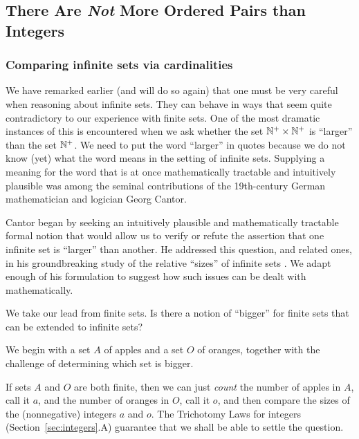 \subsection{There Are {\em Not} More Ordered Pairs than Integers}
\label{sec:cardinality-NxN}

\subsubsection{Comparing infinite sets via cardinalities}
\label{sec:compare-sets-via-card}

We have remarked earlier (and will do so again) that one must be very
careful when reasoning about infinite sets.  They can behave in ways
that seem quite contradictory to our experience with finite sets.  One
of the most dramatic instances of this is encountered when we ask
whether the set $\mathbb{N}^+ \times \mathbb{N}^+$ is ``larger'' than the set $\mathbb{N}^+$.
We need to put the word ``larger'' in quotes because we do not know
(yet) what the word means in the setting of infinite sets.  Supplying
a meaning for the word that is at once mathematically tractable and
intuitively plausible was among the seminal contributions of the
19th-century German mathematician and logician Georg
Cantor. 


Cantor began by seeking an intuitively plausible and mathematically
tractable formal notion that would allow us to verify or refute the
assertion that one infinite set is ``larger'' than another.  He
addressed this question, and related ones, in his groundbreaking study
of the relative ``sizes'' of infinite sets \cite{Cantor74,Cantor78}.
We adapt enough of his formulation to suggest how such issues can be
dealt with mathematically.

We take our lead from finite sets.  Is there a notion of ``bigger''
for finite sets that can be extended to infinite sets?

We begin with a set $A$ of apples and a set $O$ of oranges, together
with the challenge of determining which set is bigger.

\medskip

If sets $A$ and $O$ are both finite, then we can just {\em count} the
number of apples in $A$, call it $a$, and the number of oranges in
$O$, call it $o$, and then compare the sizes of the (nonnegative)
integers $a$ and $o$.  The Trichotomy Laws for integers
(Section~\ref{sec:integers}.A) guarantee that we shall be able to
settle the question.

